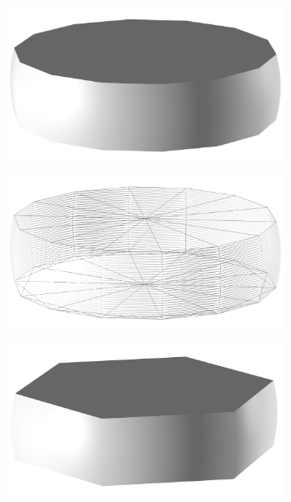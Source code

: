 \begin{figure}
  \begin{center}
    \begin{subfigure}{0.2\textwidth}
    \includegraphics[width=\linewidth]{assets/images/shapes/bugold/scale_high}
    \caption{}
    \end{subfigure}
      \begin{subfigure}{0.2\textwidth}
    \includegraphics[width=\linewidth]{assets/images/shapes/bugold/scale_high_w}
    \caption{}
    \end{subfigure}
    \begin{subfigure}{0.2\textwidth}
    \includegraphics[width=\linewidth]{assets/images/shapes/bugold/scale_low}

\end{subfigure}
\end{center}
\end{figure}

